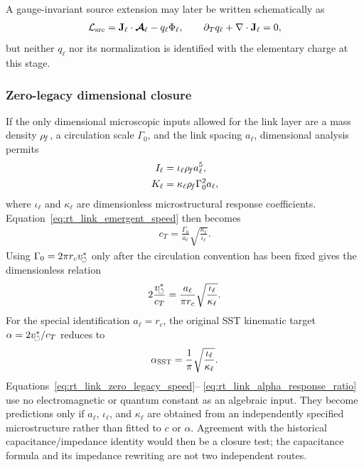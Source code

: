 A gauge-invariant source extension may later be written schematically as
\begin{align}
    \mathcal L_{\rm src}
    =
    \mathbf J_\ell\cdot\boldsymbol{\mathcal A}_\ell
    -
    q_\ell\Phi_\ell,
    \qquad
    \partial_Tq_\ell+\nabla\cdot\mathbf J_\ell=0,
    \label{eq:rt_link_source_extension}
\end{align}
but neither $q_\ell$ nor its normalization is identified with the elementary
charge at this stage.

\subsubsection{Zero-legacy dimensional closure}

If the only dimensional microscopic inputs allowed for the link layer are a
mass density $\rho_{\!f}$, a circulation scale $\Gamma_0$, and the link spacing
$a_\ell$, dimensional analysis permits
\begin{align}
    I_\ell
    &=
    \iota_\ell\rho_{\!f} a_\ell^5,
    \\
    K_\ell
    &=
    \kappa_\ell\rho_{\!f}\Gamma_0^2a_\ell,
    \label{eq:rt_link_zero_legacy_coefficients}
\end{align}
where $\iota_\ell$ and $\kappa_\ell$ are dimensionless microstructural response
coefficients.  Equation~\eqref{eq:rt_link_emergent_speed} then becomes
\begin{align}
    \boxed{
    c_T
    =
    \frac{\Gamma_0}{a_\ell}
    \sqrt{\frac{\kappa_\ell}{\iota_\ell}}
    }.
    \label{eq:rt_link_zero_legacy_speed}
\end{align}
Using $\Gamma_0=2\pi r_cv_{\!\boldsymbol{\circlearrowleft}}^{\ast}$ only after the circulation convention has been
fixed gives the dimensionless relation
\begin{align}
    2\frac{v_{\!\boldsymbol{\circlearrowleft}}^{\ast}}{c_T}
    =
    \frac{a_\ell}{\pi r_c}
    \sqrt{\frac{\iota_\ell}{\kappa_\ell}}.
    \label{eq:rt_link_alpha_route}
\end{align}
For the special identification $a_\ell=r_c$, the original SST kinematic target
$\alpha=2v_{\!\boldsymbol{\circlearrowleft}}^{\ast}/c_T$ reduces to
\begin{align}
    \alpha_{\rm SST}
    =
    \frac{1}{\pi}
    \sqrt{\frac{\iota_\ell}{\kappa_\ell}}.
    \label{eq:rt_link_alpha_response_ratio}
\end{align}
Equations~\eqref{eq:rt_link_zero_legacy_speed}--
\eqref{eq:rt_link_alpha_response_ratio} use no electromagnetic or quantum
constant as an algebraic input.  They become predictions only if $a_\ell$,
$\iota_\ell$, and $\kappa_\ell$ are obtained from an independently specified
microstructure rather than fitted to $c$ or $\alpha$.  Agreement with the
historical capacitance/impedance identity would then be a closure test; the
capacitance formula and its impedance rewriting are not two independent routes.

